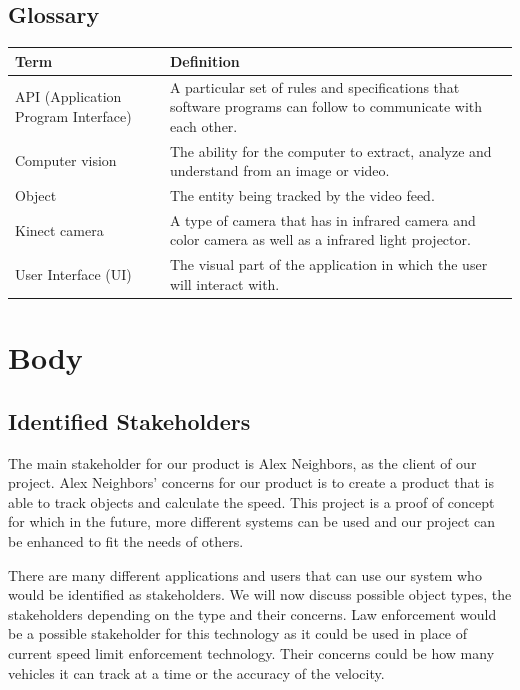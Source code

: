 \documentclass[onecolumn, draftclsnofoot,10pt, compsoc]{IEEEtran}
\begin{document}
\subsection{Glossary}
\begin{center}
	\begin{tabular}{|p{4cm}|p{12cm}|}
    
		\hline
		\textbf{Term} & \textbf{Definition} \\
		\hline
		API (Application Program Interface) & A particular set of rules and specifications that software programs can follow to communicate with each other. \\
		\hline
		Computer vision & The ability for the computer to extract, analyze and understand from an image or video. \\
		\hline
		Object & The entity being tracked by the video feed.  \\
		\hline
		Kinect camera & A type of camera that has in infrared camera and color camera as well as a infrared light projector.  \\
		\hline
    	User Interface (UI) & The visual part of the application in which the user will interact with.  \\
		\hline
	
	\end{tabular}
\end{center}

\section{Body}
\subsection{Identified Stakeholders}
The main stakeholder for our product is Alex Neighbors, as the client of our project.
Alex Neighbors' concerns for our product is to create a product that is able to track objects and calculate the speed. This project is a proof of concept for which in the future, more different systems can be used and our project can be enhanced to fit the needs of others.

There are many different applications and users that can use our system who would be identified as stakeholders.
We will now discuss possible object types, the stakeholders depending on the type and their concerns.
Law enforcement would be a possible stakeholder for this technology as it could be used in place of current speed limit enforcement technology.
Their concerns could be how many vehicles it can track at a time or the accuracy of the velocity.
\end{document}
